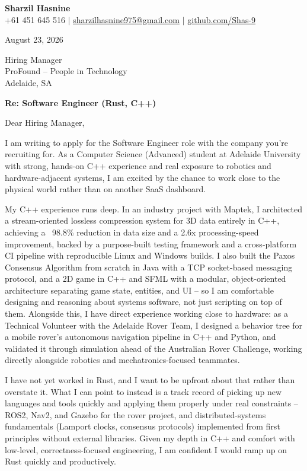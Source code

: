 \documentclass[letterpaper,11pt]{article}
\begin{document}
\begin{center}
    \textbf{\Large Sharzil Hasnine} \\ \vspace{3pt}
    \small +61 451 645 516 $|$ \href{mailto:sharzilhasnine975@gmail.com}{sharzilhasnine975@gmail.com} $|$
    \href{https://github.com/Shas-9}{github.com/Shas-9}
\end{center}

\vspace{10pt}

August 23, 2026

Hiring Manager \\
ProFound -- People in Technology \\
Adelaide, SA

\vspace{5pt}

\textbf{Re: Software Engineer (Rust, C++)}

Dear Hiring Manager,

I am writing to apply for the Software Engineer role with the company you're recruiting for. As a Computer Science (Advanced) student at Adelaide University with strong, hands-on C++ experience and real exposure to robotics and hardware-adjacent systems, I am excited by the chance to work close to the physical world rather than on another SaaS dashboard.

My C++ experience runs deep. In an industry project with Maptek, I architected a stream-oriented lossless compression system for 3D data entirely in C++, achieving a ~98.8\% reduction in data size and a 2.6x processing-speed improvement, backed by a purpose-built testing framework and a cross-platform CI pipeline with reproducible Linux and Windows builds. I also built the Paxos Consensus Algorithm from scratch in Java with a TCP socket-based messaging protocol, and a 2D game in C++ and SFML with a modular, object-oriented architecture separating game state, entities, and UI -- so I am comfortable designing and reasoning about systems software, not just scripting on top of them. Alongside this, I have direct experience working close to hardware: as a Technical Volunteer with the Adelaide Rover Team, I designed a behavior tree for a mobile rover's autonomous navigation pipeline in C++ and Python, and validated it through simulation ahead of the Australian Rover Challenge, working directly alongside robotics and mechatronics-focused teammates.

I have not yet worked in Rust, and I want to be upfront about that rather than overstate it. What I can point to instead is a track record of picking up new languages and tools quickly and applying them properly under real constraints -- ROS2, Nav2, and Gazebo for the rover project, and distributed-systems fundamentals (Lamport clocks, consensus protocols) implemented from first principles without external libraries. Given my depth in C++ and comfort with low-level, correctness-focused engineering, I am confident I would ramp up on Rust quickly and productively.
\end{document}
